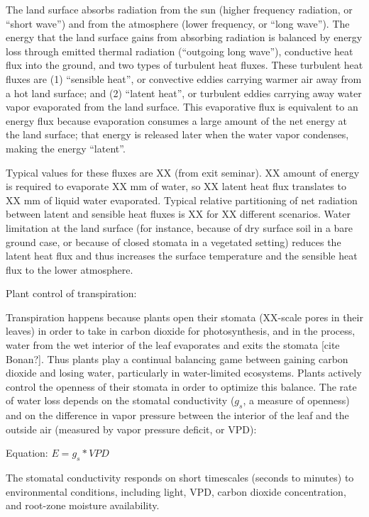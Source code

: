 The land surface absorbs radiation from the sun (higher frequency radiation, or ``short wave'') and from the atmosphere (lower frequency, or ``long wave'').  The energy that the land surface gains from absorbing radiation is balanced by energy loss through emitted thermal radiation (``outgoing long wave''), conductive heat flux into the ground, and two types of turbulent heat fluxes.  These turbulent heat fluxes are (1) ``sensible heat'', or convective eddies carrying warmer air away from a hot land surface; and (2) ``latent heat'', or turbulent eddies carrying away water vapor evaporated from the land surface.  This evaporative flux is equivalent to an energy flux because evaporation consumes a large amount of the net energy at the land surface; that energy is released later when the water vapor condenses, making the energy ``latent''.

Typical values for these fluxes are XX (from exit seminar).  XX amount of energy is required to evaporate XX mm of water, so XX latent heat flux translates to XX mm of liquid water evaporated.  Typical relative partitioning of net radiation between latent and sensible heat fluxes is XX for XX different scenarios.  Water limitation at the land surface (for instance, because of dry surface soil in a bare ground case, or because of closed stomata in a vegetated setting) reduces the latent heat flux and thus increases the surface temperature and the sensible heat flux to the lower atmosphere.

Plant control of transpiration:

Transpiration happens because plants open their stomata (XX-scale pores in their leaves) in order to take in carbon dioxide for photosynthesis, and in the process, water from the wet interior of the leaf evaporates and exits the stomata [cite Bonan?].  Thus plants play a continual balancing game between gaining carbon dioxide and losing water, particularly in water-limited ecosystems.  Plants actively control the openness of their stomata in order to optimize this balance.  The rate of water loss depends on the stomatal conductivity ($g_s$, a measure of openness) and on the difference in vapor pressure between the interior of the leaf and the outside air (measured by vapor pressure deficit, or VPD):

Equation: $E = g_s * VPD$

The stomatal conductivity responds on short timescales (seconds to minutes) to environmental conditions, including light, VPD, carbon dioxide concentration, and root-zone moisture availability.

